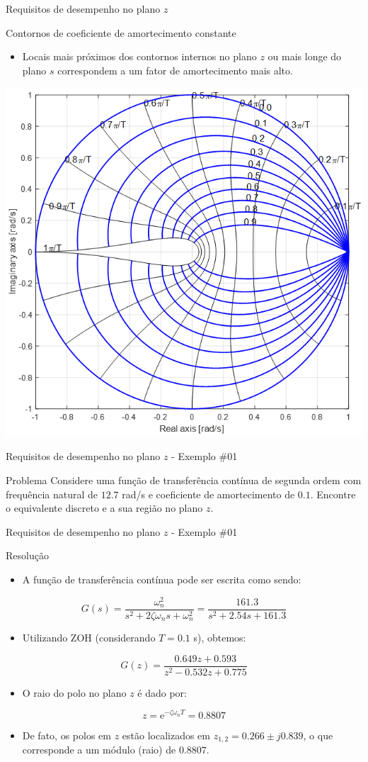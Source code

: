 \begin{frame}{Requisitos de desempenho no plano $z$}
\begin{block}{Contornos de coeficiente de amortecimento constante}
	\begin{itemize}
		\item Locais mais próximos dos contornos internos no plano $z$ ou mais longe do plano $s$ correspondem a um fator de amortecimento mais alto.
	\end{itemize}
\end{block}
\centerline{\includegraphics[width=0.5\linewidth]{Figuras/Ch11/fig5.png}}
\end{frame}

\begin{frame}{Requisitos de desempenho no plano $z$ - Exemplo \#01}
\begin{block}{Problema}
Considere uma função de transferência contínua de segunda ordem com frequência natural de $\num{12,7}$ rad/s e coeficiente de amortecimento de $\num{0,1}$. Encontre o equivalente discreto e a sua região no plano $z$.
\end{block}
\end{frame}

\begin{frame}{Requisitos de desempenho no plano $z$ - Exemplo \#01}
\begin{block}{Resolução}
\begin{itemize}
    \item A função de transferência contínua pode ser escrita como sendo:
\end{itemize}
$$G(s) = \dfrac{\omega_n^2}{s^2+ 2\zeta \omega_n s +\omega_n^2} = \dfrac{\num{161,3}}{s^2 + \num{2,54}s + \num{161,3}}$$
\begin{itemize}
    \item Utilizando ZOH (considerando $T = \num{0,1}$ s), obtemos:
\end{itemize}
$$G(z) = \dfrac{\num{0,649}z + \num{0,593}}{z^2- \num{0,532}z + \num{0,775}}$$
\begin{itemize}
    \item O raio do polo no plano $z$ é dado por:
\end{itemize}
$$z = \text{e}^{-\zeta \omega_n T} = \num{0,8807}$$
\begin{itemize}
    \item De fato, os polos em $z$ estão localizados em $z_{1,2} = \num{0,266} \pm j\num{0,839}$, o que corresponde a um módulo (raio) de $\num{0,8807}$.
\end{itemize}
\end{block}
\end{frame}

